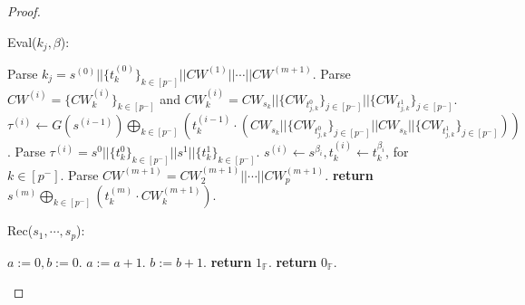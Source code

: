 \documentclass[11pt]{article}
\newcommand{\Eval}{\textsf{Eval}}
\newcommand{\Rec}{\textsf{Rec}}
\begin{document}
\begin{proof}
\begin{algorithm}
\vspace{10px}
\Eval($k_j, \beta$):
\begin{algorithmic}[1]
\State Parse $k_j = s^{(0)}||\{t_k^{(0)}\}_{k \in [p^-]}||CW^{(1)}||\cdots||CW^{(m+1)}$.
\State Parse $CW^{(i)} = \{CW^{(i)}_k\}_{k \in [p^-]}$ and $CW^{(i)}_k = CW_{s_k}||\{CW_{t_{j,k}^0}\}_{j \in [p^-]}||\{CW_{t_{j,k}^1}\}_{j \in [p^-]} $.
\State $\tau^{(i)} \leftarrow G(s^{(i-1)}) \bigoplus_{k \in [p^-]} \left(t^{(i-1)}_k \cdot \left(CW_{s_k}||\{CW_{t_{j,k}^0}\}_{j \in [p^-]}||CW_{s_k}||\{CW_{t_{j,k}^1}\}_{j \in [p^-]}\right)\right)$.
\State Parse $\tau^{(i)} = s^0||\{t_{k}^0\}_{k \in [p^-]} ||s^1||\{t_k^1\}_{k \in [p^-]}$.
\State $s^{(i)} \leftarrow s^{\beta_i}, t_k^{(i)} \leftarrow t_k^{\beta_i}$, for $k \in [p^-]$.
\EndFor
\State Parse $CW^{(m+1)} = CW^{(m+1)}_2 || \cdots || CW^{(m+1)}_p$.
\State \textbf{return} $s^{(m)} \bigoplus_{k \in [p^-]} \left(t_k^{(m)} \cdot CW^{(m+1)}_k \right)$.
\end{algorithmic}

\vspace{10px}
\Rec($s_1, \cdots, s_p$):
\begin{algorithmic}[1]
\State $a := 0, b := 0$.
\State $a := a + 1$.
\Else
\State $b := b + 1$.
\EndIf
\EndFor
{}
\State \textbf{return} $1_\mathbb{F}$.
\Else
\State \textbf{return} $0_\mathbb{F}$.
\EndIf
\end{algorithmic}
\end{algorithm}


\end{proof}




\end{document}
